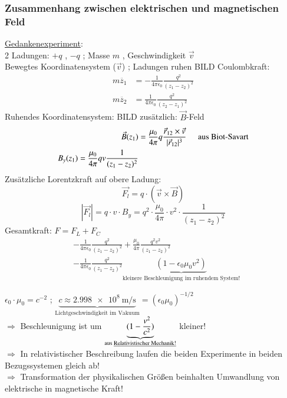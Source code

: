 \subsubsection{Zusammenhang zwischen elektrischen und magnetischen Feld}
\underline{Gedankenexperiment}: \\
2 Ladungen: \hspace{5mm} $ +q $ , $ -q $ ; Masse $ m $ , Geschwindigkeit $ \vec{v} $ \\
Bewegtes Koordinatensystem ($ \vec{v} $) ; Ladungen ruhen
BILD
Coulombkraft:
\begin{align*}
	m\ddot{z_1} &= - \frac{1}{4\pi\epsilon_0} \frac{q^2}{(z_1-z_2)^2} \\
	m\ddot{z_2} &= \frac{1}{4\pi\epsilon_0} \frac{q^2}{(z_2-z_1)^2}
\end{align*}
Ruhendes Koordinatensystem:
BILD
zusätzlich: $ \vec{B} $-Feld
\begin{align*}
	\vec{B}(z_1) &= \frac{\mu_0}{4\pi}q\frac{\vec{r}_{12} \times \vec{v}}{| \vec{r}_{12} |^3} \hspace{5mm} \text{aus Biot-Savart} \\
	B_y(z_1) = \frac{\mu_0}{4\pi}qv\frac{1}{( z_1-z_2 )^2}
\end{align*}
Zusätzliche Lorentzkraft auf obere Ladung: \\
$$ \vec{F_l} = q \cdot (\vec{v}\times \vec{B}) $$
$$ |\vec{F_l}| = q \cdot v \cdot B_y = q^2 \cdot \frac{\mu_0}{4\pi} \cdot v^2 \cdot \frac{1}{(z_1-z_2)^2} $$
Gesamtkraft: $ F=F_L+F_C $
\begin{align*}
&-\frac{1}{4\pi\epsilon_0} \frac{q^2}{(z_1-z_2)^2} + \frac{\mu_0}{4\pi} \frac{q^2v^2}{(z_1-z_2)^2}\\
&-\frac{1}{4\pi\epsilon_0} \frac{q^2}{(z_1-z_2)^2} \underbrace{(1-\epsilon_0\mu_0v^2)}_{\text{kleinere Beschleunigung im ruhendem System!}}
\end{align*}

$ \epsilon_0 \cdot \mu_0 = c^{-2}$ ; $  \underbrace{c \approx \SI{2,998e8}{\meter\per\second}}_{\text{Lichtgeschwindigkeit im Vakuum}} = (\epsilon_0\mu_0)^{-1/2} $ \\
$ \Rightarrow $ Beschleunigung ist um $ \underbrace{( 1-\frac{v^2}{c^2} )}_{\text{aus \underline{Relativistischer Mechanik!}}} $ kleiner!\\
$ \Rightarrow $ In relativistischer Beschreibung laufen die beiden Experimente in beiden Bezugssystemen gleich ab! \\
$ \Rightarrow $ Transformation der physikalischen Größen beinhalten Umwandlung von elektrische in magnetische Kraft!
